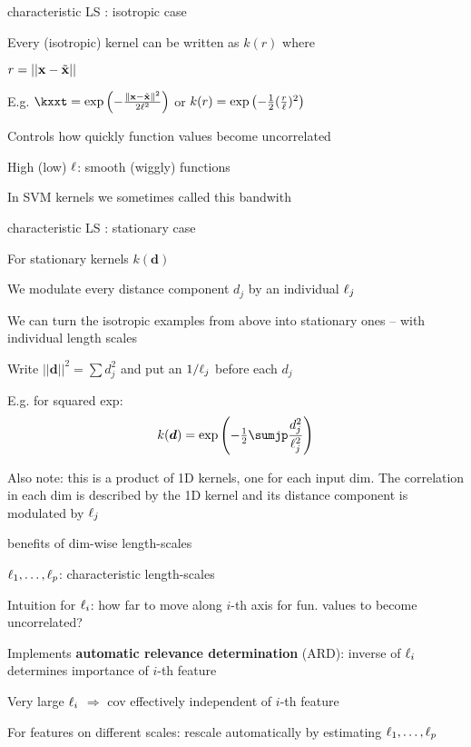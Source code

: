 \documentclass[11pt,compress,t,notes=noshow, xcolor=table]{beamer}
\begin{document}
\begin{framei}[sep=M]{characteristic LS : isotropic case}
\item Every (isotropic) kernel can be written as $k(r)$ where %
\item $r=||\mathbf{x}-\tilde{\mathbf{x}}||$
\item E.g. $\kxxt = \exp \left(-\frac{\xxtnorm^2}{2\ls^2} \right)$ or $k(r) = \exp \left(-\frac{1}{2}(\frac{r}{\ell})^2\right)$ 
\item Controls how quickly function values become uncorrelated
\item High (low) $\ell$: smooth (wiggly) functions
\vfill
{}
\item In SVM kernels we sometimes called this bandwith
\end{framei}

\begin{framei}[sep=M]{characteristic LS : stationary case}
\item For stationary kernels $k(\bm{d})$ 
\item We modulate every distance component $d_j$ by an individual $\ell_j$
\item We can turn the isotropic examples from above into 
stationary ones -- with individual length scales
\item Write $||\bm{d}||^2 = \sum d_j^2$ and put an $1/\ell_j$ before each $d_j$
\item E.g. for squared exp:
$$
  k(\bm{d}) = \exp \left(- \tfrac{1}{2} \sumjp \frac{d_j^2}{\ell_j^2} \right)
$$
\item Also note: this is a product of 1D kernels, one for each input dim. The correlation in each dim is described by the 1D kernel and its distance component is modulated by $\ell_j$
\end{framei}


\begin{framei}[sep=L]{benefits of dim-wise length-scales}
\item $\ell_1,\dots, \ell_p$: characteristic length-scales
\item Intuition for $\ell_i$: how far to move along $i$-th axis for fun. values to become uncorrelated?
\item Implements \textbf{automatic relevance determination} (ARD): inverse of $\ell_i$ determines importance of $i$-th feature
\item Very large $\ell_i$ $\Rightarrow$ cov effectively independent of $i$-th feature
\item For features on different scales: rescale automatically by estimating $\ell_1,\dots, \ell_p$ 
\end{framei}
\end{document}
